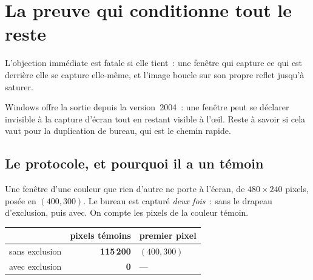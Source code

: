 \documentclass[11pt,a4paper]{article}
\begin{document}
\begin{center}
\end{center}

\section{La preuve qui conditionne tout le reste}
\label{sec:exclusion}

L'objection immédiate est fatale si elle tient~: une fenêtre qui capture ce qui
est derrière elle se capture elle-même, et l'image boucle sur son propre reflet
jusqu'à saturer.

Windows offre la sortie depuis la version~2004~: une fenêtre peut se déclarer
invisible à la capture d'écran tout en restant visible à l'\oe il. Reste à
savoir si cela vaut pour la duplication de bureau, qui est le chemin rapide.

\subsection{Le protocole, et pourquoi il a un témoin}

Une fenêtre d'une couleur que rien d'autre ne porte à l'écran, de
$480 \times 240$ pixels, posée en $(400, 300)$. Le bureau est capturé
\emph{deux fois}~: sans le drapeau d'exclusion, puis avec. On compte les pixels
de la couleur témoin.

\begin{center}
\begin{tabular}{lrl}
\toprule
& pixels témoins & premier pixel \\
\midrule
sans exclusion & \textbf{115\,200} & $(400, 300)$ \\
avec exclusion & \textbf{0} & --- \\
\bottomrule
\end{tabular}
\end{center}
\end{document}
